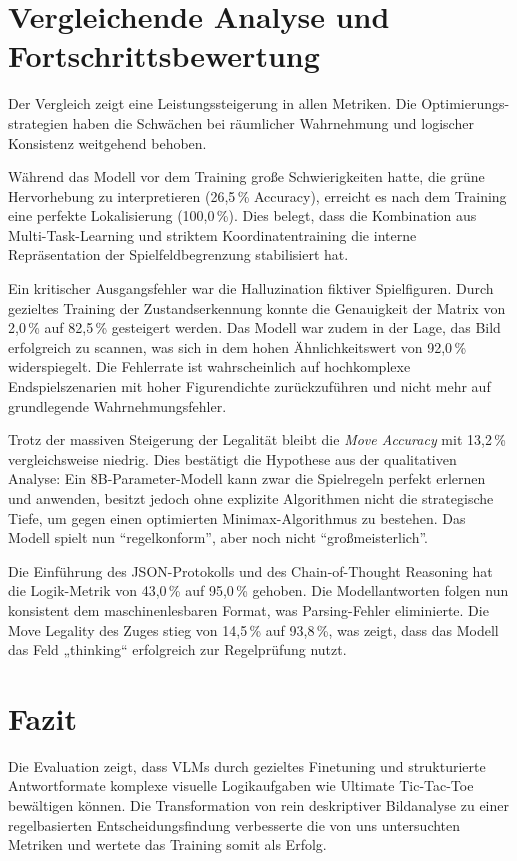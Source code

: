 \documentclass[12pt,a4paper]{article}
\begin{document}
	\newpage
	\section{Vergleichende Analyse und Fortschrittsbewertung}
	Der Vergleich zeigt eine Leistungssteigerung in allen Metriken. Die Optimierungs-strategien haben die Schwächen bei räumlicher Wahrnehmung und logischer Konsistenz weitgehend behoben.
	
	\begin{description}[leftmargin=!, labelwidth=1.5cm, style=nextline]
		\item [Räumliche Präzision] Während das Modell vor dem Training große Schwierigkeiten hatte, die grüne Hervorhebung zu interpretieren (26,5\,\% Accuracy), erreicht es nach dem Training eine perfekte Lokalisierung (100,0\,\%). Dies belegt, dass die Kombination aus Multi-Task-Learning und striktem Koordinatentraining die interne Repräsentation der Spielfeldbegrenzung stabilisiert hat.
		
		\item [Perzeptions-Halluzinationen] Ein kritischer Ausgangsfehler war die Halluzination fiktiver Spielfiguren. Durch gezieltes Training der Zustandserkennung konnte die Genauigkeit der Matrix von 2,0\,\% auf 82,5\,\% gesteigert werden. Das Modell war zudem in der Lage, das Bild erfolgreich zu scannen, was sich in dem hohen Ähnlichkeitswert von 92,0\,\% widerspiegelt. Die Fehlerrate ist wahrscheinlich auf hochkomplexe Endspielszenarien mit hoher Figurendichte zurückzuführen und nicht mehr auf grundlegende Wahrnehmungsfehler.
		
		\item [Strategische Tiefe] Trotz der massiven Steigerung der Legalität bleibt die \textit{Move Accuracy} mit 13,2\,\% vergleichsweise niedrig. Dies bestätigt die Hypothese aus der qualitativen Analyse: Ein 8B-Parameter-Modell kann zwar die Spielregeln perfekt erlernen und anwenden, besitzt jedoch ohne explizite Algorithmen nicht die strategische Tiefe, um gegen einen optimierten Minimax-Algorithmus zu bestehen. Das Modell spielt nun "`regelkonform"', aber noch nicht "`großmeisterlich"'.
		
		\item [JSON Enforcement] Die Einführung des JSON-Protokolls und des Chain-of-Thought Reasoning hat die Logik-Metrik von 43,0\,\%  auf 95,0\,\% gehoben. Die Modellantworten folgen nun konsistent dem maschinenlesbaren Format, was Parsing-Fehler eliminierte. Die Move Legality des Zuges stieg von 14,5\,\% auf 93,8\,\%, was zeigt, dass das Modell das Feld „thinking“ erfolgreich zur Regelprüfung nutzt.
	\end{description}
	
	\section{Fazit}
	Die Evaluation zeigt, dass VLMs durch gezieltes Finetuning und strukturierte Antwortformate komplexe visuelle Logikaufgaben wie Ultimate Tic-Tac-Toe bewältigen können. Die Transformation von rein deskriptiver Bildanalyse zu einer regelbasierten Entscheidungsfindung verbesserte die von uns untersuchten Metriken und wertete das Training somit als Erfolg.
\end{document}
